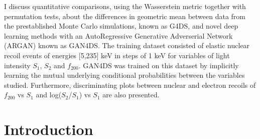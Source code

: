 \documentclass[11pt]{article} %
\begin{document}
I discuss quantitative comparisons, using the Wasserstein metric together with permutation tests,
about the differences in geometric mean between data from the prestablished Monte Carlo simulations, known as G4DS,
and novel deep learning methods with an AutoRegressive Generative
Adverserial Network (ARGAN) known as GAN4DS.
The training dataset consisted of elastic nuclear recoil events of energies [5,235] keV in steps of 1 keV for variables of light intensity $S_1$, $S_2$
 and $f_{200}$.
GAN4DS was trained on this dataset by implicitly learning the mutual underlying conditional probabilities between the variables studied.
Furthermore, discriminating plots between nuclear and electron recoils
of $f_{200}$ vs $S_1$ and log($S_2$/$S_1$) vs $S_1$ are also presented.

\pagebreak
\section{Introduction}
\end{document}
